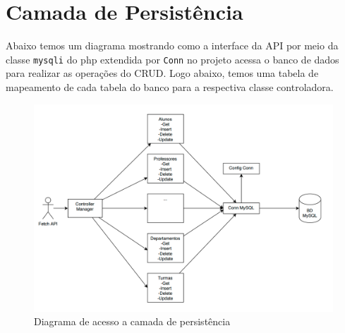\documentclass[12pt]{article}
\begin{document}
\section*{Camada de Persistência}
Abaixo temos um diagrama mostrando como a interface da API por meio da classe \texttt{mysqli} do php extendida por \texttt{Conn} no projeto acessa o banco de dados para realizar as operações do CRUD. Logo abaixo, temos uma tabela de mapeamento de cada tabela do banco para a respectiva classe controladora.

\begin{figure}[H]
    \centering
    \includegraphics[width=1\textwidth]{diagrama_persistencia.png}
    \caption{Diagrama de acesso a camada de persistência}
\end{figure}
\end{document}
